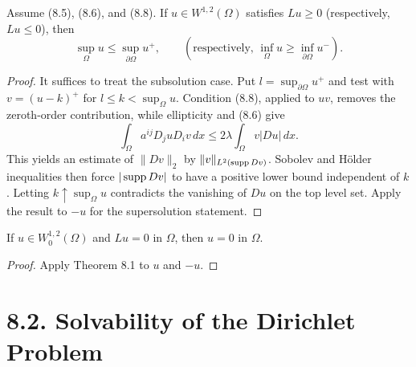 \begin{theorem}
\label{gt-thm-8-1-weak-maximum-principle}
Assume (8.5), (8.6), and (8.8). If $u\in W^{1,2}(\Omega)$ satisfies
$Lu\geq0$ (respectively, $Lu\leq0$), then
\begin{equation}
\sup_\Omega u\leq\sup_{\partial\Omega}u^+,
\qquad
\left(\text{respectively, }\inf_\Omega u\geq\inf_{\partial\Omega}u^-\right).
\tag{8.9}
\end{equation}
\end{theorem}
\begin{proof}
\sketch It suffices to treat the subsolution case. Put
$l=\sup_{\partial\Omega}u^+$ and test with $v=(u-k)^+$ for
$l\leq k<\sup_\Omega u$. Condition (8.8), applied to $uv$, removes the
zeroth-order contribution, while ellipticity and (8.6) give
\begin{equation}
\tag{8.10}
\int_\Omega a^{ij}D_j uD_i v\,dx
\leq2\lambda\int_\Omega v|Du|\,dx.
\end{equation}
This yields an estimate of
$\|Dv\|_2$ by $\|v\|_{L^2(\operatorname{supp} Dv)}$. Sobolev and H\"older inequalities then
force $|\operatorname{supp} Dv|$ to have a positive lower bound independent of $k$. Letting
$k\uparrow\sup_\Omega u$ contradicts the vanishing of $Du$ on the top level set.
Apply the result to $-u$ for the supersolution statement.
\end{proof}

\begin{corollary}[Uniqueness in $W_0^{1,2}$]
\label{gt-cor-8-2-uniqueness-zero}
If $u\in W_0^{1,2}(\Omega)$ and $Lu=0$ in $\Omega$, then $u=0$ in $\Omega$.
\end{corollary}
\begin{proof}
\sketch Apply Theorem 8.1 to $u$ and $-u$.
\end{proof}

\section*{8.2. Solvability of the Dirichlet Problem}

